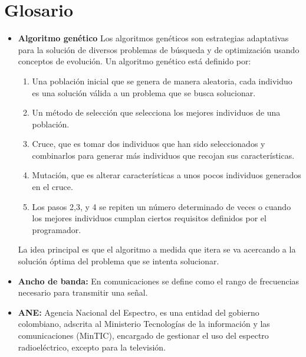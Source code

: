 \section{Glosario}
\begin{itemize}

\item{\textbf{Algoritmo genético} \cite{WGOEB} Los algoritmos genéticos son estrategias adaptativas para la solución de diversos problemas de búsqueda y de optimización usando conceptos de evolución. Un algoritmo genético está definido por:
	\begin{enumerate}
		\item Una población inicial que se genera de manera aleatoria, cada individuo es una solución válida a un problema que se busca solucionar.
		\item Un método de selección que selecciona los mejores individuos de una población.
		\item Cruce, que es tomar dos individuos que han sido seleccionados y combinarlos para generar más individuos que recojan sus características.
		\item Mutación, que es alterar características a unos pocos individuos generados en el cruce.
		\item Los pasos 2,3, y 4 se repiten un número determinado de veces o cuando los mejores individuos cumplan ciertos requisitos definidos por el programador.
	\end{enumerate}
La idea principal es que el algoritmo a medida que itera se va acercando a la solución óptima del problema que se intenta solucionar.
}

\item \textbf{Ancho de banda:} \cite{Cuadro} En comunicaciones se define como el rango de frecuencias necesario para transmitir una señal. 

\item \textbf{ANE:} \cite{ANE} Agencia Nacional del Espectro, es una entidad del gobierno colombiano, adscrita al Ministerio Tecnologías de la información y las comunicaciones (MinTIC), encargado de gestionar el uso del espectro radioeléctrico, excepto para la televisión.


\end{itemize}
